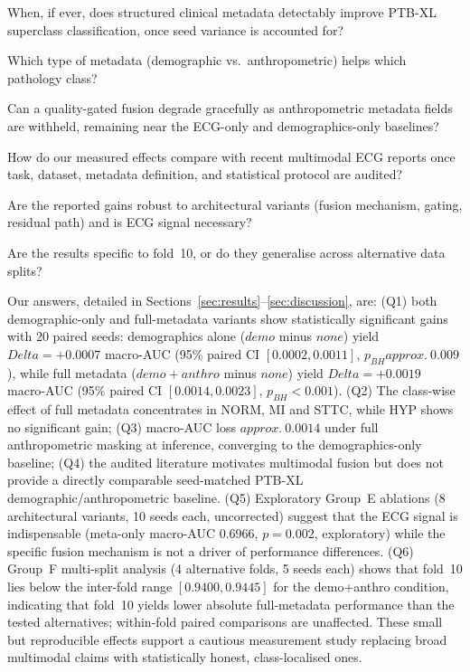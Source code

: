 \documentclass[mathematics,article,submit,pdftex]{Definitions/mdpi}
\def\texttt#1{#1}%
\def\mathrm#1{#1}%
\def\textbf#1{#1}%
\def\emph#1{#1}%
\def\Delta{Delta }%
\def\approx{approx.\ }%
\begin{document}
\begin{description}[leftmargin=1.5em, style=sameline, font=\bfseries]
\item[Q1.] When, if ever, does structured clinical metadata detectably improve PTB-XL superclass classification, once seed variance is accounted for?
\item[Q2.] Which \emph{type} of metadata (demographic vs.\ anthropometric) helps which pathology class?
\item[Q3.] Can a quality-gated fusion degrade gracefully as anthropometric metadata fields are withheld, remaining near the ECG-only and demographics-only baselines?
\item[Q4.] How do our measured effects compare with recent multimodal ECG reports once task, dataset, metadata definition, and statistical protocol are audited?
\item[Q5.] Are the reported gains robust to architectural variants (fusion mechanism, gating, residual path) and is ECG signal necessary?
\item[Q6.] Are the results specific to fold~10, or do they generalise across alternative data splits?
\end{description}

Our answers, detailed in Sections~\ref{sec:results}--\ref{sec:discussion}, are: (Q1) \emph{both} demographic-only and full-metadata variants show statistically significant gains with \textbf{20 paired seeds}: demographics alone ($\texttt{demo}$ minus $\texttt{none}$) yield $\Delta{=}{+}0.0007$ macro-AUC (95\% paired CI $[0.0002, 0.0011]$, $p_{\mathrm{BH}}{\approx}0.009$), while full metadata ($\texttt{demo+anthro}$ minus $\texttt{none}$) yield $\Delta{=}{+}0.0019$ macro-AUC (95\% paired CI $[0.0014, 0.0023]$, $p_{\mathrm{BH}}{<}0.001$). (Q2) The class-wise effect of full metadata concentrates in NORM, \emph{MI} and \emph{STTC}, while HYP shows no significant gain; (Q3) macro-AUC loss $\approx 0.0014$ under full anthropometric masking at inference, converging to the demographics-only baseline; (Q4) the audited literature motivates multimodal fusion but does not provide a directly comparable seed-matched PTB-XL demographic/anthropometric baseline. (Q5) Exploratory Group~E ablations (8 architectural variants, 10 seeds each, uncorrected) suggest that the ECG signal is indispensable (meta-only macro-AUC $0.6966$, $p{=}0.002$, exploratory) while the specific fusion mechanism is not a driver of performance differences. (Q6) Group~F multi-split analysis (4 alternative folds, 5 seeds each) shows that fold~10 lies below the inter-fold range $[0.9400, 0.9445]$ for the \texttt{demo+anthro} condition, indicating that fold~10 yields lower absolute full-metadata performance than the tested alternatives; within-fold paired comparisons are unaffected. These small but reproducible effects support a cautious measurement study replacing broad multimodal claims with statistically honest, class-localised ones.
\end{document}
